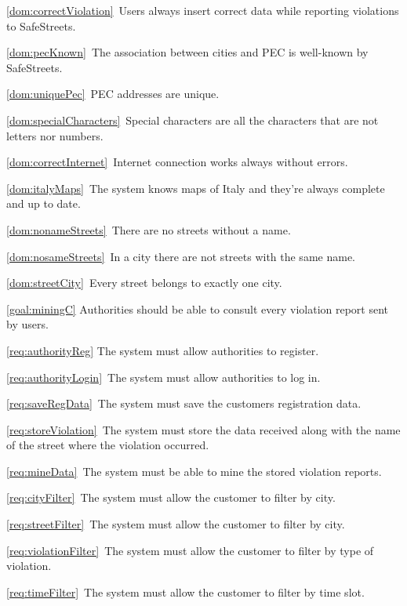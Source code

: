 \begin{description}
\begin{description}
\begin{description}
							\item \ref{dom:correctViolation}\ Users always insert correct data while reporting violations to SafeStreets.
							\item \ref{dom:pecKnown}\ The association between cities and PEC is well-known by SafeStreets.
							\item \ref{dom:uniquePec}\ PEC addresses are unique.
							\item \ref{dom:specialCharacters}\ Special characters are all the characters that are not letters nor numbers.
							\item \ref{dom:correctInternet}\ Internet connection works always without errors.
							\item \ref{dom:italyMaps}\ The system knows maps of Italy and they’re always complete and up to date.
							\item \ref{dom:nonameStreets}\ There are no streets without a name.
							\item \ref{dom:nosameStreets}\ In a city there are not streets with the same name.
							\item \ref{dom:streetCity}\ Every street belongs to exactly one city.
						\end{description}
					\item \ref{goal:miningC} Authorities should be able to consult every violation report sent by users.
						\begin{description}
							\item \ref{req:authorityReg} The system must allow authorities to register.
							\item \ref{req:authorityLogin}\ The system must allow authorities to log in.
							\item \ref{req:saveRegData}\ The system must save the customers registration data.
							\item \ref{req:storeViolation}\ The system must store the data received along with the name of the street where the violation occurred.
							\item \ref{req:mineData}\ The system must be able to mine the stored violation reports.
							\item \ref{req:cityFilter}\ The system must allow the customer to filter by city.
							\item \ref{req:streetFilter}\ The system must allow the customer to filter by city.
							\item \ref{req:violationFilter}\ The system must allow the customer to filter by type of violation.
							\item \ref{req:timeFilter}\ The system must allow the customer to filter by time slot.

\end{description}
\end{description}
\end{description}
